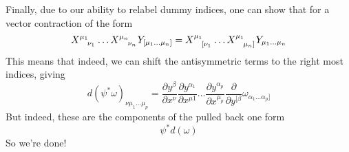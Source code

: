 \documentclass[11pt, a4paper]{article}   	%
\theoremstyle{slplain}
\begin{document}
Finally, due to our ability to relabel dummy indices, one can show that for a vector contraction of the form 
\[
	X \indices{ ^{ \mu_1 }_{ \nu_1 }} \dots X \indices{ ^{ \mu_{ n  } }_{ \nu_{ n }  }} Y_{ [  \mu_1 \dots \mu_{ n  } ] }  = X \indices{ ^{ \mu_1 }_{ [ \nu _{ 1 }}} \dots X \indices{ ^{ \mu_1 } _{ \mu_{ n } ] } } Y_{ \mu_1 \dots \mu_{ n }}   
\] 
This means that indeed, we can shift the antisymmetric terms to the right most indices, giving 
\[
	d ( \psi ^ * \omega  )_{ \nu \mu_1 \dots \mu_{ p }  } = \frac{\partial  y ^{ \beta } }{\partial x^{ \nu  } } \frac{\partial  y ^{ \alpha_1   }}{\partial x^{ \mu 1 }} \dots \frac{\partial  y ^{ \alpha_p  }}{\partial x^{ \mu_{ p  } }} \frac{\partial  }{\partial y ^{ [\beta   }} \omega _{ \alpha_1 \dots \alpha_{ p } ]}  
\] But indeed, these are the components  
of the pulled back one form 
\[
	\psi^ * d( \omega  ) 
\] So we're done! 
\end{document}
